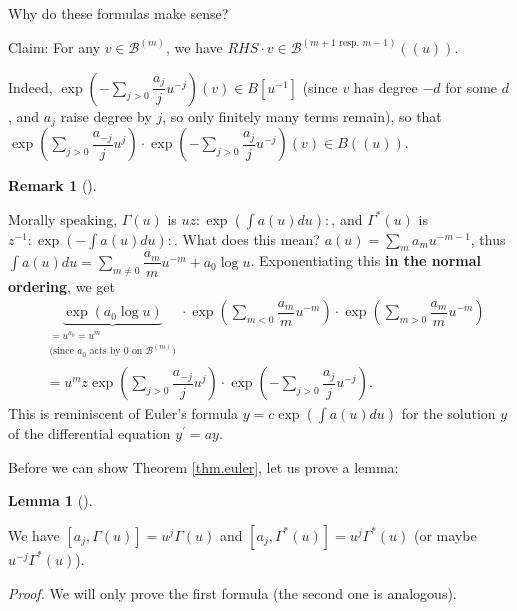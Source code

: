 \documentclass
[numbers=enddot,12pt,final,onecolumn,german,notitlepage]{scrartcl}%
\theoremstyle{definition}
\newtheorem{lem}[theo]{Lemma}
\newenvironment{lemma}[1][]
{\begin{lem}[#1]\begin{leftbar}}
{\end{leftbar}\end{lem}}
\newtheorem{remk}[theo]{Remark}
\newenvironment{remark}[1][]
{\begin{remk}[#1]\begin{leftbar}}
{\end{leftbar}\end{remk}}
\begin{document}
Why do these formulas make sense?

Claim: For any $v\in\mathcal{B}^{\left(  m\right)  }$, we have $RHS\cdot
v\in\mathcal{B}^{\left(  m+1\text{ resp. }m-1\right)  }\left(  \left(
u\right)  \right)  $.

Indeed, $\exp\left(  -\sum\limits_{j>0}\dfrac{a_{j}}{j}u^{-j}\right)  \left(
v\right)  \in B\left[  u^{-1}\right]  $ (since $v$ has degree $-d$ for some
$d$, and $a_{j}$ raise degree by $j$, so only finitely many terms remain), so
that $\exp\left(  \sum\limits_{j>0}\dfrac{a_{-j}}{j}u^{j}\right)  \cdot
\exp\left(  -\sum\limits_{j>0}\dfrac{a_{j}}{j}u^{-j}\right)  \left(  v\right)
\in B\left(  \left(  u\right)  \right)  $.

\begin{remark}
Morally speaking, $\Gamma\left(  u\right)  $ is $uz:\exp\left(  \int a\left(
u\right)  du\right)  :$, and $\Gamma^{\ast}\left(  u\right)  $ is $z^{-1}%
:\exp\left(  -\int a\left(  u\right)  du\right)  :$. What does this mean?
$a\left(  u\right)  =\sum\limits_{m}a_{m}u^{-m-1}$, thus $\int a\left(
u\right)  du=\sum\limits_{m\neq0}\dfrac{a_{m}}{m}u^{-m}+a_{0}\log u$.
Exponentiating this \textbf{in the normal ordering}, we get%
\begin{align*}
&  \underbrace{\exp\left(  a_{0}\log u\right)  }_{\substack{=u^{a_{0}}%
=u^{m}\\\text{(since }a_{0}\text{ acts by }0\text{ on }\mathcal{B}^{\left(
m\right)  }\text{)}}}\cdot\exp\left(  \sum\limits_{m<0}\dfrac{a_{m}}{m}%
u^{-m}\right)  \cdot\exp\left(  \sum\limits_{m>0}\dfrac{a_{m}}{m}u^{-m}\right)
\\
&  =u^{m}z\exp\left(  \sum\limits_{j>0}\dfrac{a_{-j}}{j}u^{j}\right)
\cdot\exp\left(  -\sum\limits_{j>0}\dfrac{a_{j}}{j}u^{-j}\right)  .
\end{align*}
This is reminiscent of Euler's formula $y=c\exp\left(  \int a\left(  u\right)
du\right)  $ for the solution $y$ of the differential equation $y^{\prime}=ay$.
\end{remark}

Before we can show Theorem \ref{thm.euler}, let us prove a lemma:

\begin{lemma}
We have $\left[  a_{j},\Gamma\left(  u\right)  \right]  =u^{j}\Gamma\left(
u\right)  $ and $\left[  a_{j},\Gamma^{\ast}\left(  u\right)  \right]
=u^{j}\Gamma^{\ast}\left(  u\right)  $ (or maybe $u^{-j}\Gamma^{\ast}\left(
u\right)  $).
\end{lemma}

\textit{Proof.} We will only prove the first formula (the second one is analogous).
\end{document}
